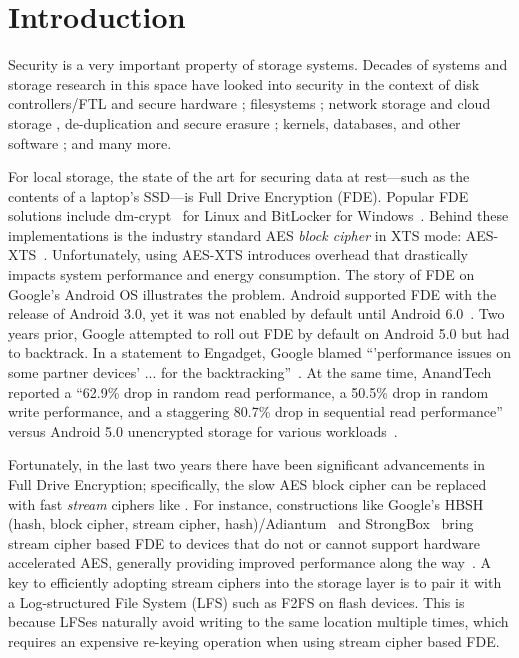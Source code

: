 \section{Introduction}\label{sec:introduction}


Security is a very important property of storage systems. Decades of systems and
storage research in this space have looked into security in the context of disk
controllers/FTL and secure hardware \cite{hardware1, hardware2, hardware3,
hardware4}; filesystems \cite{filesystems1, filesystems2, filesystems3,
filesystems4, filesystems5, filesystems6, filesystems7}; network storage and
cloud storage \cite{network1, network2, network3, network4, network5, network6,
network7, network8, network9, network10, network11, network12, network13,
network14, network15, network16}, de-duplication and secure erasure
\cite{erase1, erase2, erase3}; kernels, databases, and other software
\cite{software1, software2, software3, software4}; and many more.

For local storage, the state of the art for securing data at rest---such as the
contents of a laptop's SSD---is Full Drive Encryption (FDE). Popular FDE
solutions include dm-crypt~\cite{dmcrypt, DmC-Android} for Linux and BitLocker
for Windows~\cite{bitlocker1, bitlocker2}. Behind these implementations is the
industry standard AES \emph{block cipher} in XTS mode: AES-XTS~\cite{XTS,
XTSComments, NISTXTS}. Unfortunately, using AES-XTS introduces overhead that
drastically impacts system performance and energy consumption. The story of FDE
on Google's Android OS illustrates the problem. Android supported FDE with the
release of Android 3.0, yet it was not enabled by default until Android
6.0~\cite{android-M-mobile-motivation}. Two years prior, Google attempted to
roll out FDE by default on Android 5.0 but had to backtrack. In a statement to
Engadget, Google blamed ``'performance issues on some partner devices' ... for
the backtracking''~\cite{google-engadget}. At the same time, AnandTech reported
a ``62.9\% drop in random read performance, a 50.5\% drop in random write
performance, and a staggering 80.7\% drop in sequential read performance''
versus Android 5.0 unencrypted storage for various
workloads~\cite{android-M-mobile-motivation-2}.

Fortunately, in the last two years there have been significant advancements in
Full Drive Encryption; specifically, the slow AES block cipher can be replaced
with fast {\em stream} ciphers like \encB. For instance, constructions like
Google's HBSH (hash, block cipher, stream cipher, hash)/Adiantum~\cite{Adiantum}
and StrongBox~\cite{StrongBox} bring stream cipher based FDE to devices that do
not or cannot support hardware accelerated AES, generally providing improved
performance along the way~\cite{StrongBox}. A key to efficiently adopting stream
ciphers into the storage layer is to pair it with a Log-structured File System
(LFS) such as F2FS on flash devices. This is because LFSes naturally avoid
writing to the same location multiple times, which requires an expensive
re-keying operation when using stream cipher based FDE.

